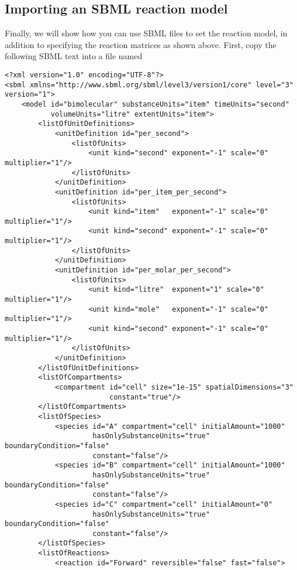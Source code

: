 \subsection{Importing an SBML reaction model}

Finally, we will show how you can use SBML files to set the reaction model, in addition to specifying the reaction matrices as shown above. First, copy the following SBML text into a file named 

{\small\begin{verbatim}
<?xml version="1.0" encoding="UTF-8"?>
<sbml xmlns="http://www.sbml.org/sbml/level3/version1/core" level="3" version="1">
    <model id="bimolecular" substanceUnits="item" timeUnits="second"
           volumeUnits="litre" extentUnits="item">
        <listOfUnitDefinitions>
            <unitDefinition id="per_second">
                <listOfUnits>
                    <unit kind="second" exponent="-1" scale="0" multiplier="1"/>
                </listOfUnits>
            </unitDefinition>
            <unitDefinition id="per_item_per_second">
                <listOfUnits>
                    <unit kind="item"   exponent="-1" scale="0" multiplier="1"/>
                    <unit kind="second" exponent="-1" scale="0" multiplier="1"/>
                </listOfUnits>
            </unitDefinition>
            <unitDefinition id="per_molar_per_second">
                <listOfUnits>
                    <unit kind="litre"  exponent="1" scale="0" multiplier="1"/>
                    <unit kind="mole"   exponent="-1" scale="0" multiplier="1"/>
                    <unit kind="second" exponent="-1" scale="0" multiplier="1"/>
                </listOfUnits>
            </unitDefinition>
        </listOfUnitDefinitions>
        <listOfCompartments>
            <compartment id="cell" size="1e-15" spatialDimensions="3"
                         constant="true"/>
        </listOfCompartments>
        <listOfSpecies>
            <species id="A" compartment="cell" initialAmount="1000"
                     hasOnlySubstanceUnits="true" boundaryCondition="false"
                     constant="false"/>
            <species id="B" compartment="cell" initialAmount="1000"
                     hasOnlySubstanceUnits="true" boundaryCondition="false"
                     constant="false"/>
            <species id="C" compartment="cell" initialAmount="0"
                     hasOnlySubstanceUnits="true" boundaryCondition="false"
                     constant="false"/>
        </listOfSpecies>
        <listOfReactions>
            <reaction id="Forward" reversible="false" fast="false">

\end{verbatim}}
